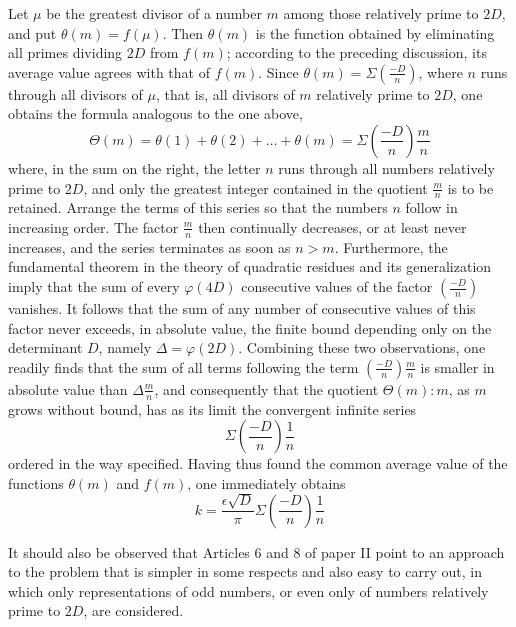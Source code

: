 \clearpage
Let $\mu$ be the greatest divisor of a number $m$ among those relatively prime to $2D$, and put $\theta(m)=f(\mu)$. Then $\theta(m)$ is the function obtained by eliminating all primes dividing $2D$ from $f(m)$; according to the preceding discussion, its average value agrees with that of $f(m)$. Since $\theta(m)=\Sigma\left(\frac{-D}n\right)$, where $n$ runs through all divisors of $\mu$, that is, all divisors of $m$ relatively prime to $2D$, one obtains the formula analogous to the one above,
\[
\Theta(m)=\theta(1)+\theta(2)+\ldots+\theta(m)=\Sigma\left(\frac{-D}n\right)\frac mn
\]
where, in the sum on the right, the letter $n$ runs through all numbers relatively prime to $2D$, and only the greatest integer contained in the quotient $\frac mn$ is to be retained. Arrange the terms of this series so that the numbers $n$ follow in increasing order. The factor $\frac mn$ then continually decreases, or at least never increases, and the series terminates as soon as $n>m$. Furthermore, the fundamental theorem in the theory of quadratic residues and its generalization imply that the sum of every $\varphi(4D)$ consecutive values of the factor $\left(\frac{-D}n\right)$ vanishes. It follows that the sum of any number of consecutive values
of this factor never exceeds, in absolute value, the finite bound depending only on the determinant $D$, namely $\Delta=\varphi(2D)$. Combining these two observations, one readily finds that the sum of all terms following the term $\left(\frac{-D}n\right)\frac mn$ is smaller in absolute value than $\Delta\frac mn$, and consequently that the quotient $\Theta(m):m$, as $m$ grows without bound, has as its limit the convergent infinite series
\[
\Sigma\left(\frac{-D}n\right)\frac1n
\]
ordered in the way specified. Having thus found the common average value of the functions $\theta(m)$ and $f(m)$, one immediately obtains
\[
k=\frac{\epsilon\surd D}\pi\Sigma\left(\frac{-D}n\right)\frac1n
\]

It should also be observed that Articles 6 and 8 of paper II point to an approach to the problem that is simpler in some respects and also easy to carry out, in which only representations of odd numbers, or even only of numbers relatively prime to $2D$, are considered.
\BookRule{35mm}
